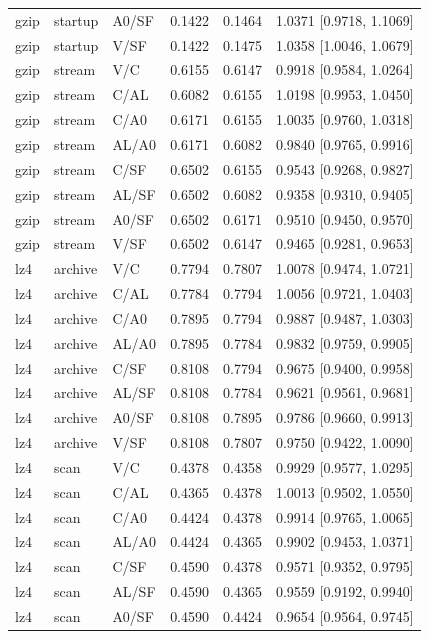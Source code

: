 \begin{longtable}{lllrrl}
gzip & startup & A0/SF & 0.1422 & 0.1464 & 1.0371 [0.9718, 1.1069] \\
gzip & startup & V/SF & 0.1422 & 0.1475 & 1.0358 [1.0046, 1.0679] \\
gzip & stream & V/C & 0.6155 & 0.6147 & 0.9918 [0.9584, 1.0264] \\
gzip & stream & C/AL & 0.6082 & 0.6155 & 1.0198 [0.9953, 1.0450] \\
gzip & stream & C/A0 & 0.6171 & 0.6155 & 1.0035 [0.9760, 1.0318] \\
gzip & stream & AL/A0 & 0.6171 & 0.6082 & 0.9840 [0.9765, 0.9916] \\
gzip & stream & C/SF & 0.6502 & 0.6155 & 0.9543 [0.9268, 0.9827] \\
gzip & stream & AL/SF & 0.6502 & 0.6082 & 0.9358 [0.9310, 0.9405] \\
gzip & stream & A0/SF & 0.6502 & 0.6171 & 0.9510 [0.9450, 0.9570] \\
gzip & stream & V/SF & 0.6502 & 0.6147 & 0.9465 [0.9281, 0.9653] \\
lz4 & archive & V/C & 0.7794 & 0.7807 & 1.0078 [0.9474, 1.0721] \\
lz4 & archive & C/AL & 0.7784 & 0.7794 & 1.0056 [0.9721, 1.0403] \\
lz4 & archive & C/A0 & 0.7895 & 0.7794 & 0.9887 [0.9487, 1.0303] \\
lz4 & archive & AL/A0 & 0.7895 & 0.7784 & 0.9832 [0.9759, 0.9905] \\
lz4 & archive & C/SF & 0.8108 & 0.7794 & 0.9675 [0.9400, 0.9958] \\
lz4 & archive & AL/SF & 0.8108 & 0.7784 & 0.9621 [0.9561, 0.9681] \\
lz4 & archive & A0/SF & 0.8108 & 0.7895 & 0.9786 [0.9660, 0.9913] \\
lz4 & archive & V/SF & 0.8108 & 0.7807 & 0.9750 [0.9422, 1.0090] \\
lz4 & scan & V/C & 0.4378 & 0.4358 & 0.9929 [0.9577, 1.0295] \\
lz4 & scan & C/AL & 0.4365 & 0.4378 & 1.0013 [0.9502, 1.0550] \\
lz4 & scan & C/A0 & 0.4424 & 0.4378 & 0.9914 [0.9765, 1.0065] \\
lz4 & scan & AL/A0 & 0.4424 & 0.4365 & 0.9902 [0.9453, 1.0371] \\
lz4 & scan & C/SF & 0.4590 & 0.4378 & 0.9571 [0.9352, 0.9795] \\
lz4 & scan & AL/SF & 0.4590 & 0.4365 & 0.9559 [0.9192, 0.9940] \\
lz4 & scan & A0/SF & 0.4590 & 0.4424 & 0.9654 [0.9564, 0.9745] \\

\end{longtable}
